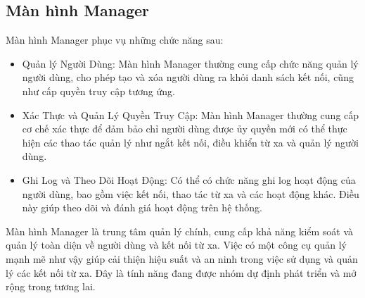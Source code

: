 \subsection{Màn hình Manager}
Màn hình Manager phục vụ những chức năng sau:
\begin{itemize}
	\item Quản lý Người Dùng: Màn hình Manager thường cung cấp chức năng quản lý người dùng, cho phép tạo và xóa người dùng ra khỏi danh sách kết nối, cũng như cấp quyền truy cập tương ứng.	
	\item Xác Thực và Quản Lý Quyền Truy Cập: Màn hình Manager thường cung cấp cơ chế xác thực để đảm bảo chỉ người dùng được ủy quyền mới có thể thực hiện các thao tác quản lý như ngắt kết nối, điều khiển từ xa và quản lý người dùng.	
	\item Ghi Log và Theo Dõi Hoạt Động: Có thể có chức năng ghi log hoạt động của người dùng, bao gồm việc kết nối, thao tác từ xa và các hoạt động khác. Điều này giúp theo dõi và đánh giá hoạt động trên hệ thống.	
\end{itemize}
Màn hình Manager là trung tâm quản lý chính, cung cấp khả năng kiểm soát và quản lý toàn diện về người dùng và kết nối từ xa. Việc có một công cụ quản lý mạnh mẽ như vậy giúp cải thiện hiệu suất và an ninh trong việc sử dụng và quản lý các kết nối từ xa. Đây là tính năng đang được nhóm dự định phát triển và mở rộng trong tương lai.










